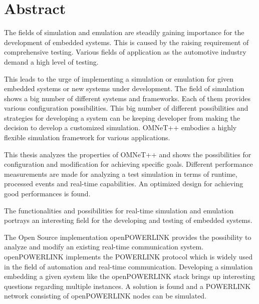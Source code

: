 \chapter{Abstract}

The fields of simulation and emulation are steadily gaining importance for the development of embedded systems.
This is caused by the raising requirement of comprehensive testing.
Various fields of application as the automotive industry demand a high level of testing.

This leads to the urge of implementing a simulation or emulation for given embedded systems or new systems under development.
The field of simulation shows a big number of different systems and frameworks.
Each of them provides various configuration possibilities.
This big number of different possibilities and strategies for developing a system can be keeping developer from making the decision to develop a customized simulation.
OMNeT++ embodies a highly flexible simulation framework for various applications.

This thesis analyzes the properties of OMNeT++ and shows the possibilities for configuration and modification for achieving specific goals.
Different performance measurements are made for analyzing a test simulation in terms of runtime, processed events and real-time capabilities.
An optimized design for achieving good performances is found.

The functionalities and possibilities for real-time simulation and emulation portrays an interesting field for the developing and testing of embedded systems.

The Open Source implementation openPOWERLINK provides the possibility to analyze and modify an existing real-time communication system.
openPOWERLINK implements the POWERLINK protocol which is widely used in the field of automation and real-time communication.
Developing a simulation embedding a given system like the openPOWERLINK stack brings up interesting questions regarding multiple instances.
A solution is found and a POWERLINK network consisting of openPOWERLINK nodes can be simulated.


%
%
%
%
